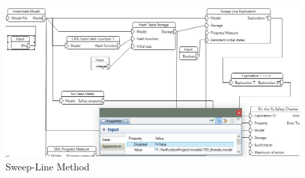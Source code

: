 
\begin{figure}[h]
	\centering
	\includegraphics[width=\textwidth]{./img/sl}
	\caption{Sweep-Line Method}
	\label{fig:sl}
\end{figure}

